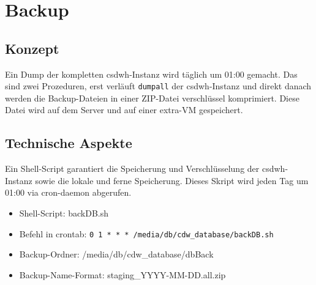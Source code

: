 \chapter{Backup}
\label{ch:back}
  \section{Konzept}
  Ein Dump der kompletten \ac{csdwh}-Instanz wird täglich um 01:00 gemacht. Das sind zwei Prozeduren, erst verläuft  \texttt{dumpall} der \ac{csdwh}-Instanz und direkt danach werden die Backup-Dateien in einer ZIP-Datei verschlüssel komprimiert.
  Diese Datei wird auf dem Server und auf einer extra-VM gespeichert.
  \section{Technische Aspekte}
  Ein Shell-Script garantiert die Speicherung und Verschlüsselung der \ac{csdwh}-Instanz sowie die lokale und ferne Speicherung. Dieses Skript wird jeden Tag um 01:00 via cron-daemon abgerufen.
  \begin{itemize}
   \item Shell-Script: backDB.sh
   \item Befehl in crontab: \texttt{0 1 * * * /media/db/cdw\_database/backDB.sh}
   \item Backup-Ordner: /media/db/cdw\_database/dbBack
   \item Backup-Name-Format: staging\_YYYY-MM-DD.all.zip
  \end{itemize}